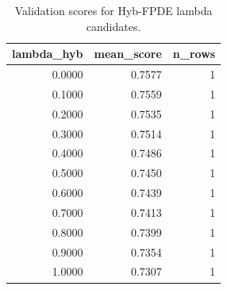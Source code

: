 \begin{table}[t]
\caption{Validation scores for Hyb-FPDE lambda candidates.}
\label{tab:lambda_distribution_computed}
\centering
\begin{tabular}{rrr}
\toprule
lambda\_hyb & mean\_score & n\_rows \\
\midrule
0.0000 & 0.7577 & 1 \\
0.1000 & 0.7559 & 1 \\
0.2000 & 0.7535 & 1 \\
0.3000 & 0.7514 & 1 \\
0.4000 & 0.7486 & 1 \\
0.5000 & 0.7450 & 1 \\
0.6000 & 0.7439 & 1 \\
0.7000 & 0.7413 & 1 \\
0.8000 & 0.7399 & 1 \\
0.9000 & 0.7354 & 1 \\
1.0000 & 0.7307 & 1 \\
\bottomrule
\end{tabular}

\end{table}
